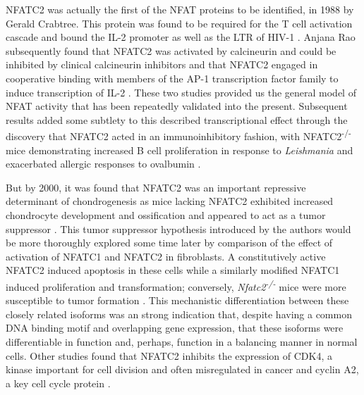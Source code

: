 NFATC2 was actually the first of the NFAT proteins to be identified, in 1988 by Gerald Crabtree. This protein was found to be required for the T cell activation cascade and bound the IL-2 promoter as well as the LTR of HIV-1 \citep{Shaw1988}. Anjana Rao subsequently found that NFATC2 was activated by calcineurin and could be inhibited by clinical calcineurin inhibitors and that NFATC2 engaged in cooperative binding with members of the AP-1 transcription factor family to induce transcription of IL-2 \citep{Jain1993}. These two studies provided us the general model of NFAT activity that has been repeatedly validated into the present. Subsequent results added some subtlety to this described transcriptional effect through the discovery that NFATC2 acted in an immunoinhibitory fashion, with NFATC2\textsuperscript{-/-} mice demonstrating increased B cell proliferation in response to \textit{Leishmania} and exacerbated allergic responses to ovalbumin \citep{Xanthoudakis1996}. 

But by 2000, it was found that NFATC2 was an important repressive determinant of chondrogenesis as mice lacking NFATC2 exhibited increased chondrocyte development and ossification and appeared to act as a tumor suppressor \citep{Ranger2000}. This tumor suppressor hypothesis introduced by the authors would be more thoroughly explored some time later by comparison of the effect of activation of NFATC1 and NFATC2 in fibroblasts. A constitutively active NFATC2 induced apoptosis in these cells while a similarly modified NFATC1 induced proliferation and transformation; conversely, \textit{Nfatc2\textsuperscript{-/-}} mice were more susceptible to tumor formation \citep{Robbs2008}. This mechanistic differentiation between these closely related isoforms was an strong indication that, despite having a common DNA binding motif and overlapping gene expression, that these isoforms were differentiable in function and, perhaps, function in a balancing manner in normal cells. Other studies found that NFATC2 inhibits the expression of CDK4, a kinase important for cell division and often misregulated in cancer \citep{Baksh2002, OLeary2016} and cyclin A2, a key cell cycle protein \citep{Carvalho2007}.    


